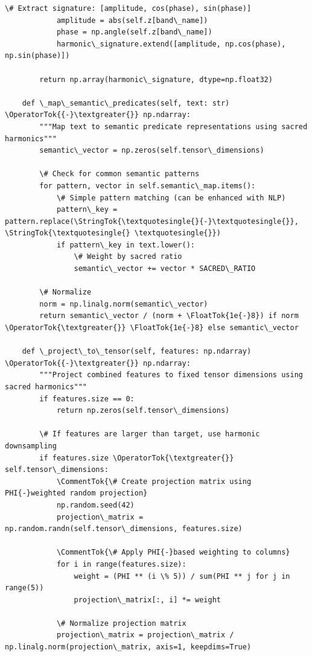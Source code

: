 \documentclass[12pt]{article}
\begin{document}
\begin{lstlisting}[basicstyle=\ttfamily\small]
            \# Extract signature: [amplitude, cos(phase), sin(phase)]
            amplitude = abs(self.z[band\_name])
            phase = np.angle(self.z[band\_name])
            harmonic\_signature.extend([amplitude, np.cos(phase), np.sin(phase)])
        
        return np.array(harmonic\_signature, dtype=np.float32)
    
    def \_map\_semantic\_predicates(self, text: str) \OperatorTok{{-}\textgreater{}} np.ndarray:
        """Map text to semantic predicate representations using sacred harmonics"""
        semantic\_vector = np.zeros(self.tensor\_dimensions)
        
        \# Check for common semantic patterns
        for pattern, vector in self.semantic\_map.items():
            \# Simple pattern matching (can be enhanced with NLP)
            pattern\_key = pattern.replace(\StringTok{\textquotesingle{}{-}\textquotesingle{}}, \StringTok{\textquotesingle{} \textquotesingle{}})
            if pattern\_key in text.lower():
                \# Weight by sacred ratio
                semantic\_vector += vector * SACRED\_RATIO
        
        \# Normalize
        norm = np.linalg.norm(semantic\_vector)
        return semantic\_vector / (norm + \FloatTok{1e{-}8}) if norm \OperatorTok{\textgreater{}} \FloatTok{1e{-}8} else semantic\_vector
    
    def \_project\_to\_tensor(self, features: np.ndarray) \OperatorTok{{-}\textgreater{}} np.ndarray:
        """Project combined features to fixed tensor dimensions using sacred harmonics"""
        if features.size == 0:
            return np.zeros(self.tensor\_dimensions)
        
        \# If features are larger than target, use harmonic downsampling
        if features.size \OperatorTok{\textgreater{}} self.tensor\_dimensions:
            \CommentTok{\# Create projection matrix using PHI{-}weighted random projection}
            np.random.seed(42)
            projection\_matrix = np.random.randn(self.tensor\_dimensions, features.size)
            
            \CommentTok{\# Apply PHI{-}based weighting to columns}
            for i in range(features.size):
                weight = (PHI ** (i \% 5)) / sum(PHI ** j for j in range(5))
                projection\_matrix[:, i] *= weight
            
            \# Normalize projection matrix
            projection\_matrix = projection\_matrix / np.linalg.norm(projection\_matrix, axis=1, keepdims=True)
            

\end{lstlisting}
\end{document}
